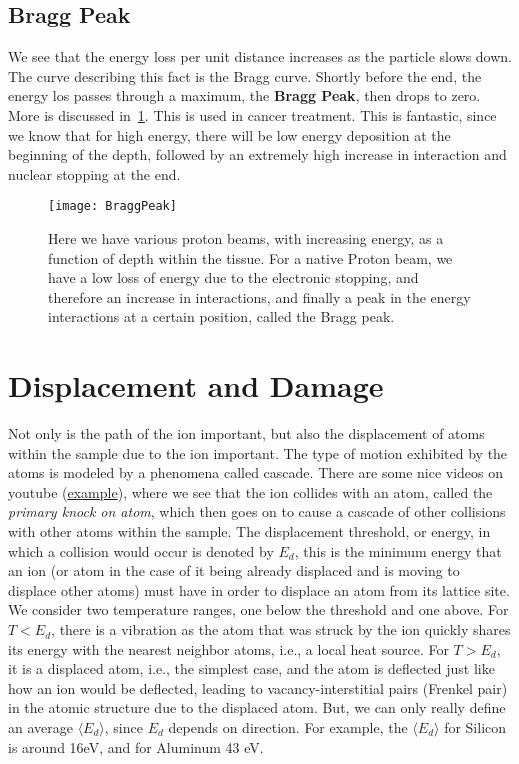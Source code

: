 \subsection{Bragg Peak}\label{subsec:bragg-peak}
We see that the energy loss per unit distance increases as the particle slows down.
The curve describing this fact is the Bragg curve.
Shortly before the end, the energy los passes through a maximum, the \textbf{Bragg Peak}, then drops to zero.
More is discussed in~\ref{fig:bragg}.
This is used in cancer treatment.
This is fantastic, since we know that for high energy, there will be low energy deposition at the beginning of the depth, followed by an extremely high increase in interaction and nuclear stopping at the end.
\begin{figure}
	\centering
	\texttt{[image: BraggPeak]}
	\caption{Here we have various proton beams, with increasing energy, as a function of depth within the tissue. For a native Proton beam, we have a low loss of energy due to the electronic stopping, and therefore an increase in interactions, and finally a peak in the energy interactions at a certain position, called the Bragg peak.}
	\label{fig:bragg}
\end{figure}


\section{Displacement and Damage}\label{sec:displacement-and-damage}
Not only is the path of the ion important, but also the displacement of atoms within the sample due to the ion important.
The type of motion exhibited by the atoms is modeled by a phenomena called cascade.
There are some nice videos on youtube (\href{https://www.youtube.com/watch?v=HNFwXnGmie4}{example}), where we see that the ion collides with an atom, called the \textit{primary knock on atom}, which then goes on to cause a cascade of other collisions with other atoms within the sample.
The displacement threshold, or energy, in which a collision would occur is denoted by $E_d$, this is the minimum energy that an ion (or atom in the case of it being already displaced and is moving to displace other atoms) must have in order to displace an atom from its lattice site.
We consider two temperature ranges, one below the threshold and one above.
For $T < E_d$, there is a vibration as the atom that was struck by the ion quickly shares its energy with the nearest neighbor atoms, i.e., a local heat source.
For $T > E_d$, it is a displaced atom, i.e., the simplest case, and the atom is deflected just like how an ion would be deflected, leading to vacancy-interstitial pairs (Frenkel pair) in the atomic structure due to the displaced atom.
But, we can only really define an average $ \langle E_d \rangle $, since $E_d$ depends on direction.
For example, the $ \langle E_d \rangle $ for Silicon is around 16eV, and for Aluminum 43 eV.

